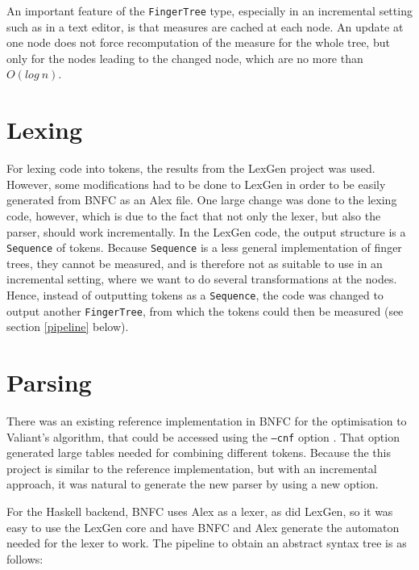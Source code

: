 \documentclass[a4paper,12pt,twosided]{report}
\renewcommand\cite{\citep}
\begin{document}
An important feature of the \texttt{FingerTree} type, especially in an incremental
setting such as in a text editor, is that measures are cached at each node. An
update at one node does not force recomputation of the measure for the whole
tree, but only for the nodes leading to the changed node, which are no more than
$O(log\ n)$. 

\section{Lexing}
For lexing code into tokens, the results from the LexGen project was used.
However, some modifications had to be done to LexGen in order to be easily
generated from BNFC as an Alex file. One large change was done to the lexing
code, however, which is due to the fact that not only the lexer, but also the
parser, should work incrementally. In the LexGen code, the output structure is a
\texttt{Sequence} of tokens. Because \texttt{Sequence} is a less general
implementation of finger trees, they cannot be measured, and is therefore not as
suitable to use in an incremental setting, where we want to do several
transformations at the nodes. Hence, instead of outputting tokens
as a \texttt{Sequence}, the code was changed to output another
\texttt{FingerTree}, from which the tokens could then be measured (see section
\ref{pipeline} below).

\section{Parsing}
There was an existing reference implementation in BNFC for the optimisation to
Valiant's algorithm, that could be accessed using the \texttt{--cnf} option
\cite{parparsepaper}.  That option generated large tables needed for combining
different tokens. Because the this project is similar to the reference
implementation, but with an incremental approach, it was natural to generate the
new parser by using a new option.

For the Haskell backend, BNFC uses Alex as a lexer, as did LexGen, so it was
easy to use the LexGen core and have BNFC and Alex generate the automaton needed for
the lexer to work. The pipeline to obtain an abstract syntax tree is as follows:
\end{document}
